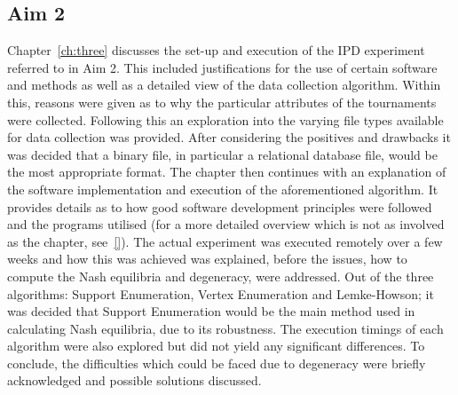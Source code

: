 \subsection{Aim 2}\label{subsec:Aim_2_concl}
Chapter~\ref{ch:three} discusses the set-up and execution of the IPD experiment
referred to in Aim 2. This included justifications for the use of certain
software and methods as well as a detailed view of the data collection
algorithm. Within this, reasons were given as to why the particular attributes
of the tournaments were collected. Following this an exploration into the
varying file types available for data collection was provided. After considering
the positives and drawbacks it was decided that a binary file, in particular a
relational database file, would be the most appropriate format. The chapter then
continues with an explanation of the software implementation and execution of
the aforementioned algorithm. It provides details as to how good software
development principles were followed and the programs utilised (for a more
detailed overview which is not as involved as the chapter, see~\ref{}). The
actual experiment was executed remotely over a few weeks and how this was
achieved was explained, before the issues, how to compute the Nash equilibria
and degeneracy, were addressed. Out of the three algorithms: Support
Enumeration, Vertex Enumeration and Lemke-Howson; it was decided that Support
Enumeration would be the main method used in calculating Nash equilibria, due to
its robustness. The execution timings of each algorithm were also explored but
did not yield any significant differences. To conclude, the difficulties which
could be faced due to degeneracy were briefly acknowledged and possible
solutions discussed.

